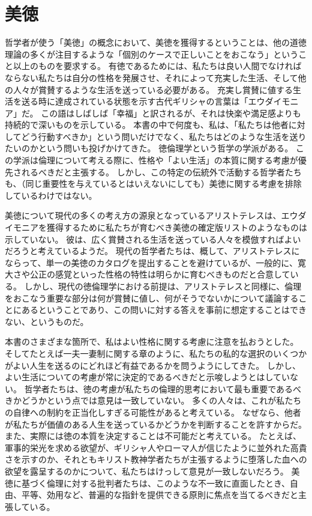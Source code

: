 \documentclass[paper=a4,book,openany]{jlreq} \usepackage{mystyle}
\begin{document}
\section{美徳}

哲学者が使う「美徳」の概念において、美徳を獲得するということは、他の道徳理論の多くが注目するような「個別のケースで正しいことをおこなう」ということ以上のものを要求する。
有徳であるためには、私たちは良い人間でなければならない{\DDASH}私たちは自分の性格を発展させ、それによって充実した生活、そして他の人々が賞賛するような生活を送っている必要がある。
充実し賞賛に値する生活を送る時に達成されている状態を示す古代ギリシャの言葉は「エウダイモニア」だ。
この語はしばしば「幸福」と訳されるが、それは快楽や満足感よりも持続的で深いものを示している。
本書の中で何度も、私は、「私たちは他者に対してどう行動すべきか」という問いだけでなく、私たちはどのような生活を送りたいのかという問いも投げかけてきた。
徳倫理学という哲学の学派がある。
この学派は倫理について考える際に、性格や「よい生活」の本質に関する考慮が優先されるべきだと主張する。
しかし、この特定の伝統外で活動する哲学者たちも、（同じ重要性を与えているとはいえないにしても）美徳に関する考慮を排除しているわけではない。

美徳について現代の多くの考え方の源泉となっているアリストテレスは、エウダイモニアを獲得するために私たちが育むべき美徳の確定版リストのようなものは示していない。
彼は、広く賞賛される生活を送っている人々を模倣すればよいだろうと考えているようだ。
現代の哲学者たちは、概して、アリストテレスにならって、単一の美徳のカタログを提出することを避けているが、一般的に、寛大さや公正の感覚といった性格の特性は明らかに育むべきものだと合意している。
しかし、現代の徳倫理学における前提は、アリストテレスと同様に、倫理をおこなう重要な部分は何が賞賛に値し、何がそうでないかについて議論することにあるということであり、この問いに対する答えを事前に想定することはできない、というものだ。

本書のさまざまな箇所で、私はよい性格に関する考慮に注意を払おうとした。
そしてたとえば一夫一妻制に関する章のように、私たちの私的な選択のいくつかがよい人生を送るのにどれほど有益であるかを問うようにしてきた。
しかし、よい生活についての考慮が常に決定的であるべきだと示唆しようとはしていない。
哲学者たちは、徳の考慮が私たちの倫理的思考において最も重要であるべきかどうかという点では意見は一致していない。
多くの人々は、これが私たちの自律への制約を正当化しすぎる可能性があると考えている。
なぜなら、他者が私たちが価値のある人生を送っているかどうかを判断することを許すからだ。
また、実際には徳の本質を決定することは不可能だと考えている。
たとえば、軍事的栄光を求める欲望が、ギリシャ人やローマ人が信じたように並外れた高貴さを示すのか、それともキリスト教神学者たちが主張するように堕落した血への欲望を露呈するのかについて、私たちはけっして意見が一致しないだろう。
美徳に基づく倫理に対する批判者たちは、このような不一致に直面したとき、自由、平等、効用など、普遍的な指針を提供できる原則に焦点を当てるべきだと主張している。
\end{document}
